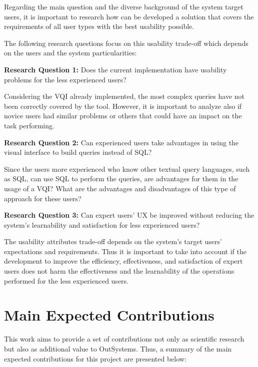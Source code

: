 Regarding the main question and the diverse background of the system target users, it is important to research how can be developed a solution that covers the requirements of all user types with the best usability possible.

The following research questions focus on this usability trade-off which depends on the users and the system particularities:


\textbf{Research Question 1:} Does the current implementation have usability problems for the less experienced users?


Considering the \gls{VQI} already implemented, the most complex queries have not been correctly covered by the tool. However, it is important to analyze also if novice users had similar problems or others that could have an impact on the task performing.


\textbf{Research Question 2:} Can experienced users take advantages in using the visual interface to build queries instead of \gls{SQL}?


Since the users more experienced who know other textual query languages, such as \gls{SQL}, can use \gls{SQL} to perform the queries, are advantages for them in the usage of a \gls{VQI}? What are the advantages and disadvantages of this type of approach for these users?


\textbf{Research Question 3:} Can expert users' \gls{UX} be improved without reducing the system's learnability and satisfaction for less experienced users?



The usability attributes trade-off depends on the system's target users' expectations and requirements. Thus it is important to take into account if the development to improve the efficiency, effectiveness, and satisfaction of expert users does not harm the effectiveness and the learnability of the operations performed for the less experienced users.

\section{Main Expected Contributions}
\label{sec:main_exp_contributions}
This work aims to provide a set of contributions not only as scientific research but also as additional value to OutSystems. Thus, a summary of the main expected contributions for this project are presented below:

